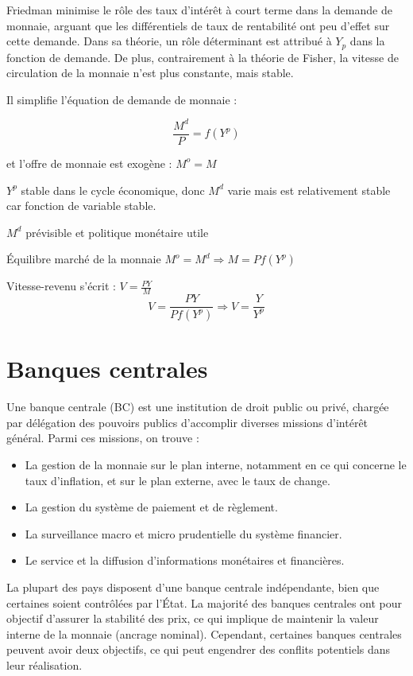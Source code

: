 \documentclass[a4paper, 12pt]{report}
\begin{document}
Friedman minimise le rôle des taux d'intérêt à court terme dans la demande de monnaie, arguant que les différentiels de taux de rentabilité ont peu d'effet sur cette demande. Dans sa théorie, un rôle déterminant est attribué à \( Y_p \) dans la fonction de demande. De plus, contrairement à la théorie de Fisher, la vitesse de circulation de la monnaie n'est plus constante, mais stable.

Il simplifie l'équation de demande de monnaie : 

\[\frac{M^d}{P} = f(Y^p) \]

et l'offre de monnaie est exogène : $M^o = M$

$Y^p$ stable dans le cycle économique, donc $M^d$ varie mais est relativement stable car fonction de variable stable.

$M^d$ prévisible et politique monétaire utile

Équilibre marché de la monnaie $M^o = M^d \Rightarrow M = P f(Y^p)$

Vitesse-revenu s'écrit : \( V = \frac{PY}{M} \)
\[ V = \frac{PY}{Pf(Y^p)} \Rightarrow V = \frac{Y}{Y^p}\]

\chapter{Banques centrales}

Une banque centrale (BC) est une institution de droit public ou privé, chargée par délégation des pouvoirs publics d'accomplir diverses missions d'intérêt général. Parmi ces missions, on trouve :

\begin{itemize}
	\item La gestion de la monnaie sur le plan interne, notamment en ce qui concerne le taux d'inflation, et sur le plan externe, avec le taux de change.
	\item La gestion du système de paiement et de règlement.
	\item La surveillance macro et micro prudentielle du système financier.
	\item Le service et la diffusion d'informations monétaires et financières.
\end{itemize}

La plupart des pays disposent d'une banque centrale indépendante, bien que certaines soient contrôlées par l'État. La majorité des banques centrales ont pour objectif d'assurer la stabilité des prix, ce qui implique de maintenir la valeur interne de la monnaie (ancrage nominal). Cependant, certaines banques centrales peuvent avoir deux objectifs, ce qui peut engendrer des conflits potentiels dans leur réalisation.
\end{document}
